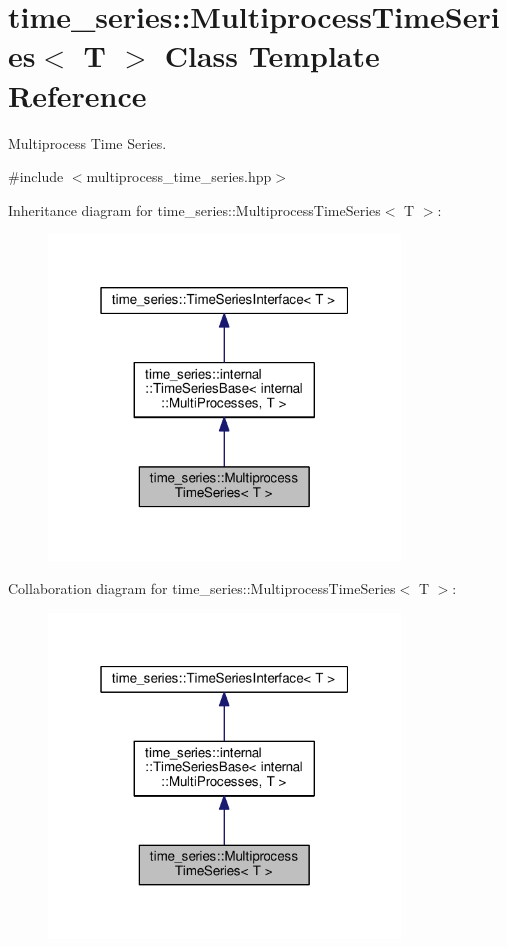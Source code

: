 \hypertarget{classtime__series_1_1MultiprocessTimeSeries}{}\section{time\+\_\+series\+:\+:Multiprocess\+Time\+Series$<$ T $>$ Class Template Reference}
\label{classtime__series_1_1MultiprocessTimeSeries}


Multiprocess Time Series.  




{\ttfamily \#include $<$multiprocess\+\_\+time\+\_\+series.\+hpp$>$}



Inheritance diagram for time\+\_\+series\+:\+:Multiprocess\+Time\+Series$<$ T $>$\+:
\nopagebreak
\begin{figure}[H]
\begin{center}
\leavevmode
\includegraphics[width=265pt]{classtime__series_1_1MultiprocessTimeSeries__inherit__graph}
\end{center}
\end{figure}


Collaboration diagram for time\+\_\+series\+:\+:Multiprocess\+Time\+Series$<$ T $>$\+:
\nopagebreak
\begin{figure}[H]
\begin{center}
\leavevmode
\includegraphics[width=265pt]{classtime__series_1_1MultiprocessTimeSeries__coll__graph}
\end{center}
\end{figure}
